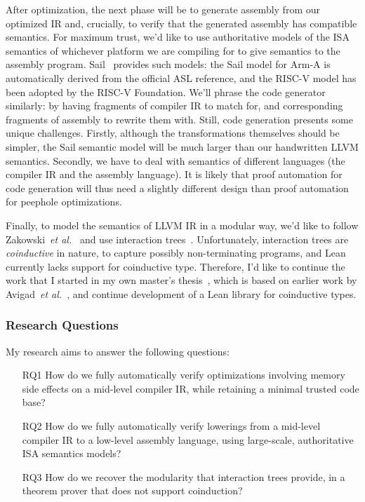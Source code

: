 \documentclass[a4paper]{scrartcl}
\newcommand*{\etal}{~\emph{et al.}}
\begin{document}
After optimization, the next phase will be to generate assembly from our
optimized IR and, crucially, to verify that the generated assembly has
compatible semantics. For maximum trust, we'd like to
use authoritative models of the ISA semantics of whichever platform we
are compiling for to give semantics to the assembly program. Sail~\cite{armstrongISASemanticsARMv8a2019} provides such models: the
Sail model for Arm-A is automatically derived from the official ASL
reference, and the RISC-V model has been adopted by the RISC-V
Foundation. We'll phrase the code generator similarly: by having
fragments of compiler IR to match for, and corresponding fragments of
assembly to rewrite them with. Still, code generation presents some
unique challenges. Firstly, although the transformations themselves
should be simpler, the Sail semantic model will be much larger than our
handwritten LLVM semantics. Secondly, we have to deal with semantics of
different languages (the compiler IR and the assembly language). It is
likely that proof automation for code generation will thus need a
slightly different design than proof automation for peephole
optimizations.

Finally, to model the semantics of LLVM IR in a modular way, we'd like
to follow Zakowski\etal{}~\cite{zakowskiModularCompositionalExecutable2021} and use
interaction trees~\cite{xiaInteractionTreesRepresenting2020}.
Unfortunately, interaction trees are \emph{coinductive} in nature, to
capture possibly non-terminating programs, and Lean currently lacks
support for coinductive type. Therefore, I'd like to continue the work
that I started in my own master's thesis~\cite{keizerImplementingDefinitionalCodatatype}, which is based on earlier
work by Avigad\etal{}~\cite{avigadDataTypesQuotients2019}, and
continue development of a Lean library for coinductive types.

\subsubsection*{Research Questions}

My research aims to answer the following questions:
\begin{enumerate}
  \item[\textsc{RQ1}]\label{research-question-1}
    How do we fully automatically verify optimizations involving memory side effects on a mid-level compiler IR, 
    while retaining a minimal trusted code base?

  \item[\textsc{RQ2}]
    How do we fully automatically verify lowerings from a mid-level compiler IR
  to a low-level assembly language, using large-scale, authoritative ISA semantics models?

  \item[\textsc{RQ3}] 
    How do we recover the modularity that interaction trees provide,
      in a theorem prover that does not support coinduction?
\end{enumerate}
\end{document}
